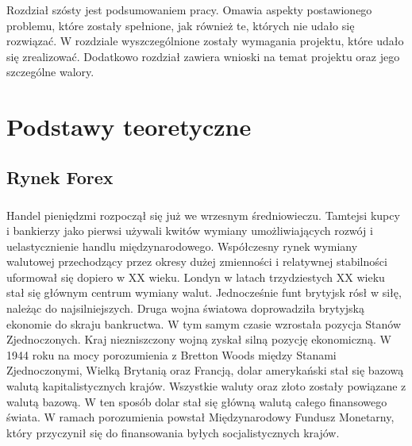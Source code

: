 \documentclass[pdflatex,11pt]{aghdpl}
\begin{document}
Rozdział szósty jest podsumowaniem pracy. Omawia aspekty postawionego problemu, które zostały spełnione, jak również te, których nie udało się rozwiązać. W rozdziale wyszczególnione zostały wymagania projektu, które udało się zrealizować. Dodatkowo rozdział zawiera wnioski na temat projektu oraz jego szczególne walory.
\chapter{Podstawy teoretyczne}
\label{chap:teoria}

\section{Rynek Forex}
\label{sec:forex}
\paragraph{}
Handel pieniędzmi rozpoczął się już we wrzesnym średniowieczu. Tamtejsi kupcy i bankierzy jako pierwsi używali kwitów wymiany umożliwiających rozwój i uelastycznienie handlu międzynarodowego. Współczesny rynek wymiany walutowej przechodzący przez okresy dużej zmienności i relatywnej stabilności uformował się dopiero w XX wieku. Londyn w latach trzydziestych XX wieku stał się głównym centrum wymiany walut. Jednocześnie funt brytyjsk rósł w siłę, należąc do najsilniejszych. Druga wojna światowa doprowadziła brytyjską ekonomie do skraju bankructwa. W tym samym czasie wzrostała pozycja Stanów Zjednoczonych. Kraj niezniszczony wojną zyskał silną pozycję ekonomiczną. W 1944 roku na mocy porozumienia z Bretton Woods między Stanami Zjednoczonymi, Wielką Brytanią oraz Francją, dolar amerykański stał się bazową walutą kapitalistycznych krajów. Wszystkie waluty oraz złoto zostały powiązane z walutą bazową. W ten sposób dolar stał się główną walutą całego finansowego świata. W ramach porozumienia powstał Międzynarodowy Fundusz Monetarny, który przyczynił się do finansowania byłych socjalistycznych krajów.\cite{9} 
\end{document}
